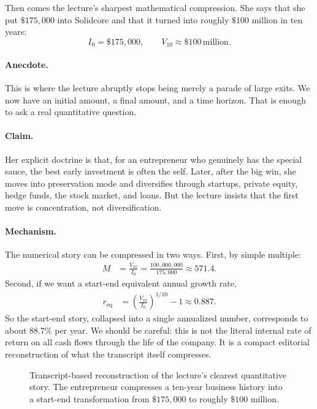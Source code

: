 Then comes the lecture's sharpest mathematical compression. She says that she put \(\$175{,}000\) into Solidcore and that it turned into roughly \(\$100\) million in ten years:
\begin{equation}
I_0=\$175{,}000,
\qquad
V_{10}\approx \$100\,\text{million}.
\end{equation}

\paragraph{Anecdote.}
This is where the lecture abruptly stops being merely a parade of large exits. We now have an initial amount, a final amount, and a time horizon. That is enough to ask a real quantitative question.

\paragraph{Claim.}
Her explicit doctrine is that, for an entrepreneur who genuinely has the special sauce, the best early investment is often the self. Later, after the big win, she moves into preservation mode and diversifies through startups, private equity, hedge funds, the stock market, and loans. But the lecture insists that the first move is concentration, not diversification.

\paragraph{Mechanism.}
The numerical story can be compressed in two ways. First, by simple multiple:
\begin{align}
M
&=
\frac{V_{10}}{I_0}
=
\frac{100{,}000{,}000}{175{,}000}
\approx 571.4.
\end{align}
Second, if we want a start-end equivalent annual growth rate,
\begin{align}
r_{\text{eq}}
&=
\left(\frac{V_{10}}{I_0}\right)^{1/10}-1
\approx 0.887.
\end{align}
So the start-end story, collapsed into a single annualized number, corresponds to about \(88.7\%\) per year. We should be careful: this is not the literal internal rate of return on all cash flows through the life of the company. It is a compact editorial reconstruction of what the transcript itself compresses.

\begin{figure}[h]
\centering
{}
\caption{Transcript-based reconstruction of the lecture's clearest quantitative story. The entrepreneur compresses a ten-year business history into a start-end transformation from \(\$175{,}000\) to roughly \(\$100\) million.}
\end{figure}

